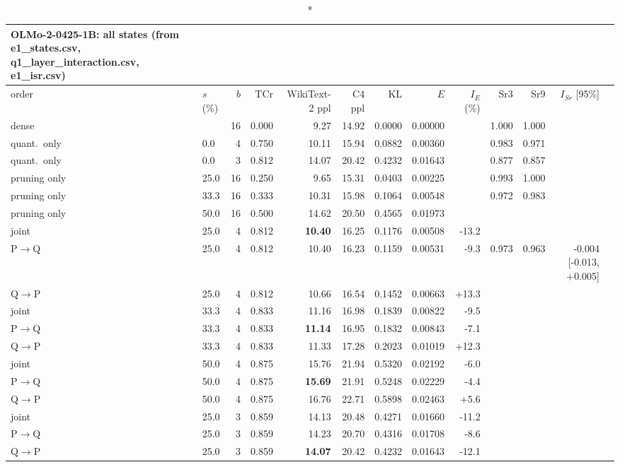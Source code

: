 \documentclass{article}
\begin{document}
\clearpage
\begin{longtable}{llrrrrrrrrrrl}
\caption*{\textbf{OLMo-2-0425-1B}: all states (from e1\_states.csv, q1\_layer\_interaction.csv, e1\_isr.csv)}\\
\toprule order & $s$ (\%) & $b$ & TCr & WikiText-2 ppl & C4 ppl & KL & $E$ & $I_E$ (\%) & Sr3 & Sr9 & $I_{Sr}$ [95\%] \\ \midrule \endhead
dense &  & 16 & 0.000 & 9.27 & 14.92 & 0.0000 & 0.00000 &  & 1.000 & 1.000 &  \\
quant.\ only & 0.0 & 4 & 0.750 & 10.11 & 15.94 & 0.0882 & 0.00360 &  & 0.983 & 0.971 &  \\
quant.\ only & 0.0 & 3 & 0.812 & 14.07 & 20.42 & 0.4232 & 0.01643 &  & 0.877 & 0.857 &  \\
pruning only & 25.0 & 16 & 0.250 & 9.65 & 15.31 & 0.0403 & 0.00225 &  & 0.993 & 1.000 &  \\
pruning only & 33.3 & 16 & 0.333 & 10.31 & 15.98 & 0.1064 & 0.00548 &  & 0.972 & 0.983 &  \\
pruning only & 50.0 & 16 & 0.500 & 14.62 & 20.50 & 0.4565 & 0.01973 &  &  &  &  \\
joint & 25.0 & 4 & 0.812 & \textbf{10.40} & 16.25 & 0.1176 & 0.00508 & -13.2 &  &  &  \\
P$\to$Q & 25.0 & 4 & 0.812 & 10.40 & 16.23 & 0.1159 & 0.00531 & -9.3 & 0.973 & 0.963 & -0.004 [-0.013, +0.005] \\
Q$\to$P & 25.0 & 4 & 0.812 & 10.66 & 16.54 & 0.1452 & 0.00663 & +13.3 &  &  &  \\
joint & 33.3 & 4 & 0.833 & 11.16 & 16.98 & 0.1839 & 0.00822 & -9.5 &  &  &  \\
P$\to$Q & 33.3 & 4 & 0.833 & \textbf{11.14} & 16.95 & 0.1832 & 0.00843 & -7.1 &  &  &  \\
Q$\to$P & 33.3 & 4 & 0.833 & 11.33 & 17.28 & 0.2023 & 0.01019 & +12.3 &  &  &  \\
joint & 50.0 & 4 & 0.875 & 15.76 & 21.94 & 0.5320 & 0.02192 & -6.0 &  &  &  \\
P$\to$Q & 50.0 & 4 & 0.875 & \textbf{15.69} & 21.91 & 0.5248 & 0.02229 & -4.4 &  &  &  \\
Q$\to$P & 50.0 & 4 & 0.875 & 16.76 & 22.71 & 0.5898 & 0.02463 & +5.6 &  &  &  \\
joint & 25.0 & 3 & 0.859 & 14.13 & 20.48 & 0.4271 & 0.01660 & -11.2 &  &  &  \\
P$\to$Q & 25.0 & 3 & 0.859 & 14.23 & 20.70 & 0.4316 & 0.01708 & -8.6 &  &  &  \\
Q$\to$P & 25.0 & 3 & 0.859 & \textbf{14.07} & 20.42 & 0.4232 & 0.01643 & -12.1 &  &  &  \\

\end{longtable}
\end{document}
